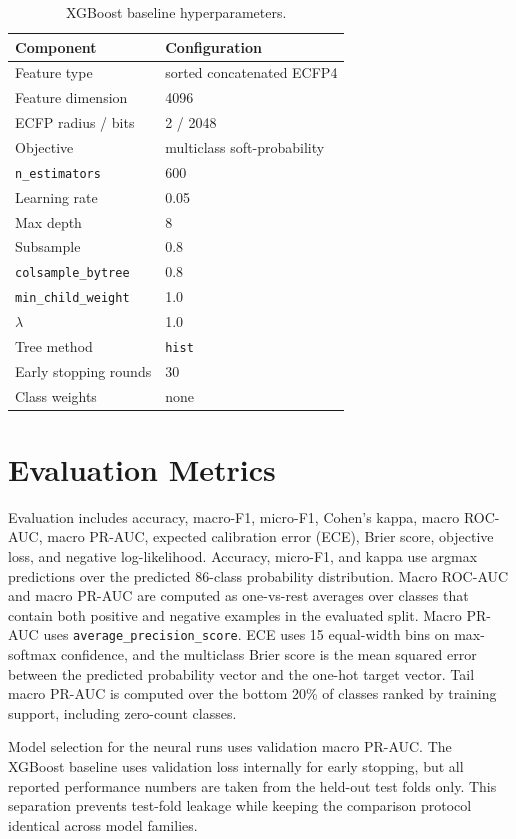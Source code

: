 \begin{table}[H]
\centering
\caption{XGBoost baseline hyperparameters.}
\label{tab:xgboost_hyperparams}
\begin{tabular}{ll}
\toprule
Component & Configuration \\
\midrule
Feature type & sorted concatenated ECFP4 \\
Feature dimension & 4096 \\
ECFP radius / bits & 2 / 2048 \\
Objective & multiclass soft-probability \\
\texttt{n\_estimators} & 600 \\
Learning rate & 0.05 \\
Max depth & 8 \\
Subsample & 0.8 \\
\texttt{colsample\_bytree} & 0.8 \\
\texttt{min\_child\_weight} & 1.0 \\
\(\lambda\) & 1.0 \\
Tree method & \texttt{hist} \\
Early stopping rounds & 30 \\
Class weights & none \\
\bottomrule
\end{tabular}
\end{table}

\section{Evaluation Metrics}
Evaluation includes accuracy, macro-F1, micro-F1, Cohen's kappa, macro ROC-AUC, macro PR-AUC, expected calibration error (ECE), Brier score, objective loss, and negative log-likelihood. Accuracy, micro-F1, and kappa use argmax predictions over the predicted 86-class probability distribution. Macro ROC-AUC and macro PR-AUC are computed as one-vs-rest averages over classes that contain both positive and negative examples in the evaluated split. Macro PR-AUC uses \texttt{average\_precision\_score}. ECE uses 15 equal-width bins on max-softmax confidence, and the multiclass Brier score is the mean squared error between the predicted probability vector and the one-hot target vector. Tail macro PR-AUC is computed over the bottom 20\% of classes ranked by training support, including zero-count classes.

Model selection for the neural runs uses validation macro PR-AUC. The XGBoost baseline uses validation loss internally for early stopping, but all reported performance numbers are taken from the held-out test folds only. This separation prevents test-fold leakage while keeping the comparison protocol identical across model families.

